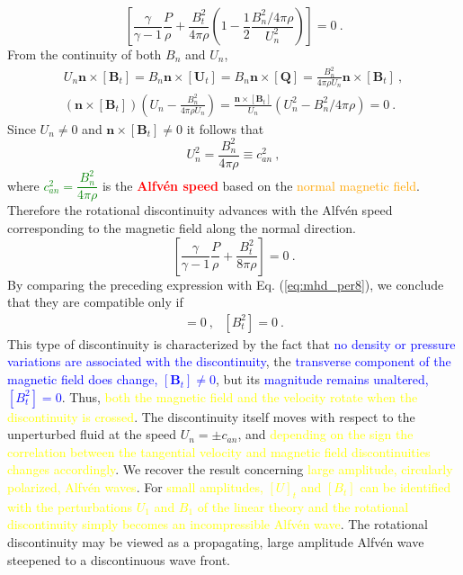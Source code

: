 \documentclass[12pt,a4paper]{article}
\renewcommand{\vec}[1]{\boldsymbol{#1}}
\begin{document}
\begin{equation}
\left[ \frac{\gamma}{\gamma-1}\frac{P}{\rho} +\frac{B_t^2}{4\pi \rho} \left(1 -\frac{1}{2} \frac{B_n^2/4\pi \rho}{U_n^2} \right) \right] = 0 ~.
\end{equation}
From the continuity of both $B_n$ and $U_n$, 
\begin{align*}
U_n \vec{n} \times [\vec{B}_t] = B_n \vec{n} \times [\vec{U}_t] = B_n\vec{n} \times [\vec{Q}] = \frac{B_n^2}{4\pi \rho U_n } \vec{n} \times [\vec{B}_t] ~, \\
\left( \vec{n} \times [\vec{B}_t]  \right) \left( U_n - \frac{B_n^2}{4\pi \rho U_n}  \right) = \frac{\vec{n} \times [\vec{B}_t]}{U_n} (U_n^2 -B_n^2 /4\pi \rho) = 0 ~. 
\end{align*}
Since $U_n \neq 0$ and $\vec{n} \times [\vec{B}_t] \neq 0$ it follows that
\begin{equation}
U_n^2 = \frac{B_n^2}{4\pi \rho} \equiv c_{an}^2 ~,
\end{equation}
where \textcolor{green}{$c_{an}^2 = \dfrac{B_n^2}{4\pi \rho}$} is the \textcolor{red}{\bf Alfv\'en speed} based on the \textcolor{orange}{normal magnetic field}. Therefore the rotational discontinuity advances with the Alfv\'en speed corresponding to the magnetic field along the normal direction. 
\begin{equation*}
\left[ \frac{\gamma}{\gamma-1}\frac{P}{\rho} +\frac{B_t^2}{8\pi \rho} \right] = 0 ~.
\end{equation*}
By comparing the preceding expression with Eq. (\ref{eq:mhd_per8}), we conclude that they are compatible only if
\begin{align*}
[P] = 0 ~, ~~~ [B_t^2] = 0 ~.
\end{align*}
This type of discontinuity is characterized by the fact that \textcolor{blue}{no density or pressure variations are associated with the discontinuity}, the \textcolor{blue}{transverse component of the magnetic field does change, $[\vec{B}_t] \neq 0$}, but its \textcolor{blue}{magnitude remains unaltered, $[B_t^2] = 0$}. Thus, \textcolor{yellow}{both the magnetic field and the velocity rotate when the discontinuity is crossed}. The discontinuity itself moves with respect to the unperturbed fluid at the speed $U_n = \pm c_{an}$, and \textcolor{yellow}{depending on the sign the correlation between the tangential velocity and magnetic field discontinuities changes accordingly}. We recover the result concerning \textcolor{yellow}{large amplitude, circularly polarized, Alfv\'en waves}. For \textcolor{yellow}{small amplitudes, $[U]_t$ and $[B_t]$ can be identified with the perturbations $U_1$ and $B_1$ of the linear theory and the rotational discontinuity simply becomes an incompressible Alfv\'en wave}. The rotational discontinuity may be viewed as a propagating, large amplitude Alfv\'en wave steepened to a discontinuous wave front. 
\end{document}
